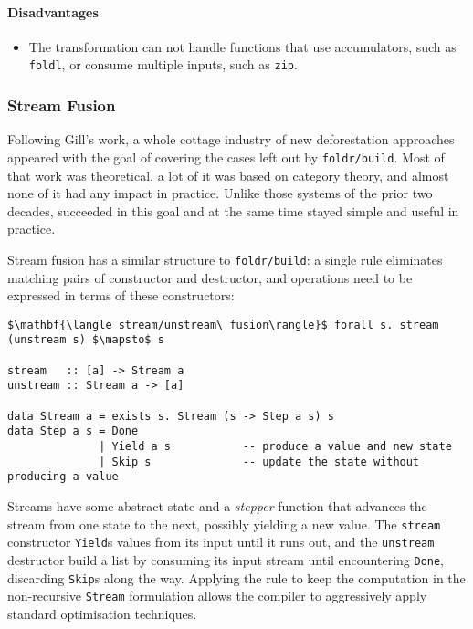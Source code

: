 \paragraph{Disadvantages}
\begin{itemize}
    \item The transformation can not handle functions that use accumulators,
        such as \texttt{foldl}, or consume multiple inputs, such as
        \texttt{zip}.
\end{itemize}


\subsubsection{Stream Fusion}

Following Gill's work, a whole cottage industry of new deforestation approaches
appeared with the goal of covering the cases left out by \texttt{foldr/build}.
Most of that work was theoretical, a lot of it was based on category theory, and
almost none of it had any impact in practice. Unlike those systems of the prior
two decades,  \cite{Coutts:2007} succeeded in this goal and
at the same time stayed simple and useful in practice.

Stream fusion has a similar structure to \texttt{foldr/build}: a single rule
eliminates matching pairs of constructor and destructor, and operations need to
be expressed in terms of these constructors:
%
\begin{lstlisting}[style=Haskell,numbers=none,mathescape=true,caption={The \emph{stream fusion} transformation}]
$\mathbf{\langle stream/unstream\ fusion\rangle}$ forall s. stream (unstream s) $\mapsto$ s

stream   :: [a] -> Stream a
unstream :: Stream a -> [a]

data Stream a = exists s. Stream (s -> Step a s) s
data Step a s = Done
              | Yield a s           -- produce a value and new state
              | Skip s              -- update the state without producing a value
\end{lstlisting}

Streams have some abstract state and a \emph{stepper} function that advances the
stream from one state to the next, possibly yielding a new value. The
\texttt{stream} constructor \texttt{Yield}s values from its input until it runs
out, and the \texttt{unstream} destructor build a list by consuming its input
stream until encountering \texttt{Done}, discarding \texttt{Skip}s along the
way. Applying the rule to keep the computation in the non-recursive
\texttt{Stream} formulation allows the compiler to aggressively apply standard
optimisation techniques.

